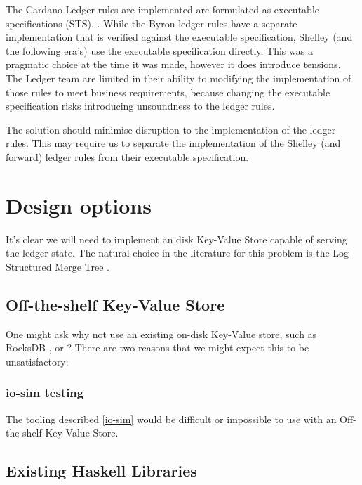 \documentclass[11pt,a4paper]{article}
\begin{document}
The Cardano Ledger rules are implemented are formulated as executable
specifications (STS). . While the Byron ledger rules have
a separate implementation that is verified against the executable specification,
Shelley (and the following era's) use the executable specification directly.
This was a pragmatic choice at the time it was made, however it does introduce
tensions. The Ledger team are limited in their ability to modifying the
implementation of those rules to meet business requirements, because changing
the executable specification risks introducing unsoundness to the ledger rules.

The solution should minimise disruption to the implementation of the ledger
rules. This may require us to separate the implementation of the Shelley (and
forward) ledger rules from their executable specification.

\section{Design options}
\label{options}

It's clear we will need to implement an disk Key-Value Store capable of serving
the ledger state. The natural choice in the literature for this problem is the Log Structured Merge Tree . 

\subsection{Off-the-shelf Key-Value Store}


One might ask why not use an existing on-disk Key-Value store, such as
RocksDB , or ? There are two
reasons that we might expect this to be unsatisfactory:

\subsubsection{io-sim testing}
The tooling described \ref{io-sim} would be difficult or impossible to use with
an Off-the-shelf Key-Value Store.

\subsection{Existing Haskell Libraries}
\end{document}
